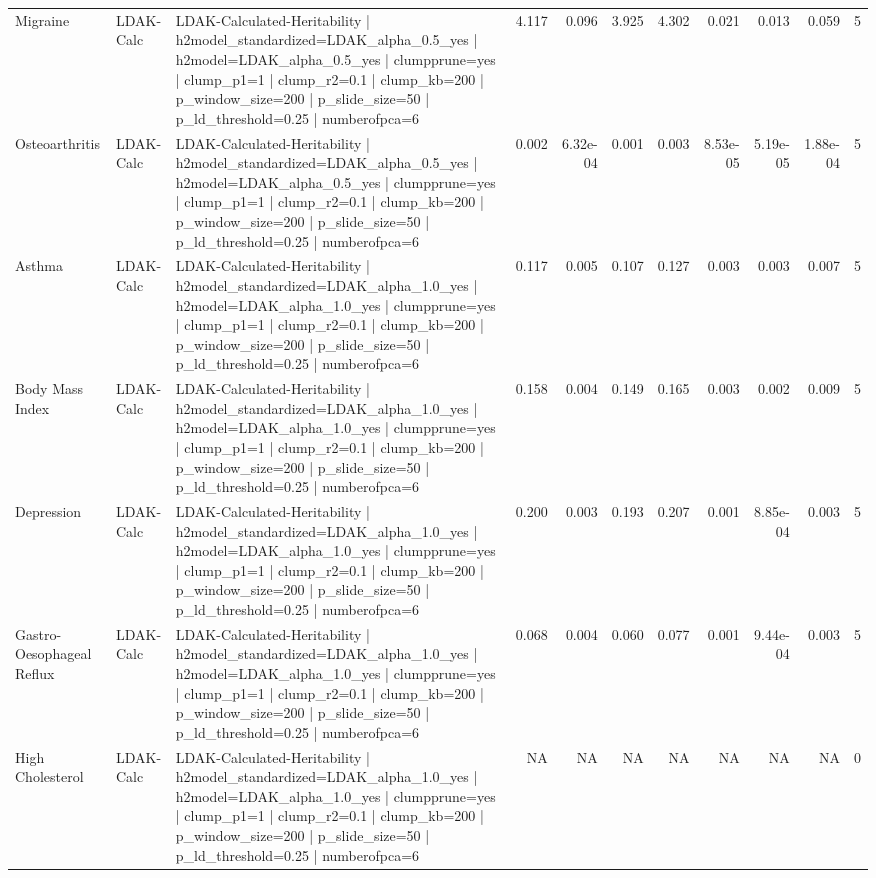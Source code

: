 \begin{landscape}
\begin{longtable}{p{2.4cm}p{1.8cm}p{6.0cm}rrrrrrrr}
Migraine & LDAK-Calc & LDAK-Calculated-Heritability | h2model\_standardized=LDAK\_alpha\_0.5\_yes | h2model=LDAK\_alpha\_0.5\_yes | clumpprune=yes | clump\_p1=1 | clump\_r2=0.1 | clump\_kb=200 | p\_window\_size=200 | p\_slide\_size=50 | p\_ld\_threshold=0.25 | numberofpca=6 & 4.117 & 0.096 & 3.925 & 4.302 & 0.021 & 0.013 & 0.059 & 5 \\
Osteoarthritis & LDAK-Calc & LDAK-Calculated-Heritability | h2model\_standardized=LDAK\_alpha\_0.5\_yes | h2model=LDAK\_alpha\_0.5\_yes | clumpprune=yes | clump\_p1=1 | clump\_r2=0.1 | clump\_kb=200 | p\_window\_size=200 | p\_slide\_size=50 | p\_ld\_threshold=0.25 | numberofpca=6 & 0.002 & 6.32e-04 & 0.001 & 0.003 & 8.53e-05 & 5.19e-05 & 1.88e-04 & 5 \\
Asthma & LDAK-Calc & LDAK-Calculated-Heritability | h2model\_standardized=LDAK\_alpha\_1.0\_yes | h2model=LDAK\_alpha\_1.0\_yes | clumpprune=yes | clump\_p1=1 | clump\_r2=0.1 | clump\_kb=200 | p\_window\_size=200 | p\_slide\_size=50 | p\_ld\_threshold=0.25 | numberofpca=6 & 0.117 & 0.005 & 0.107 & 0.127 & 0.003 & 0.003 & 0.007 & 5 \\
Body Mass Index & LDAK-Calc & LDAK-Calculated-Heritability | h2model\_standardized=LDAK\_alpha\_1.0\_yes | h2model=LDAK\_alpha\_1.0\_yes | clumpprune=yes | clump\_p1=1 | clump\_r2=0.1 | clump\_kb=200 | p\_window\_size=200 | p\_slide\_size=50 | p\_ld\_threshold=0.25 | numberofpca=6 & 0.158 & 0.004 & 0.149 & 0.165 & 0.003 & 0.002 & 0.009 & 5 \\
Depression & LDAK-Calc & LDAK-Calculated-Heritability | h2model\_standardized=LDAK\_alpha\_1.0\_yes | h2model=LDAK\_alpha\_1.0\_yes | clumpprune=yes | clump\_p1=1 | clump\_r2=0.1 | clump\_kb=200 | p\_window\_size=200 | p\_slide\_size=50 | p\_ld\_threshold=0.25 | numberofpca=6 & 0.200 & 0.003 & 0.193 & 0.207 & 0.001 & 8.85e-04 & 0.003 & 5 \\
Gastro-Oesophageal Reflux & LDAK-Calc & LDAK-Calculated-Heritability | h2model\_standardized=LDAK\_alpha\_1.0\_yes | h2model=LDAK\_alpha\_1.0\_yes | clumpprune=yes | clump\_p1=1 | clump\_r2=0.1 | clump\_kb=200 | p\_window\_size=200 | p\_slide\_size=50 | p\_ld\_threshold=0.25 | numberofpca=6 & 0.068 & 0.004 & 0.060 & 0.077 & 0.001 & 9.44e-04 & 0.003 & 5 \\
High Cholesterol & LDAK-Calc & LDAK-Calculated-Heritability | h2model\_standardized=LDAK\_alpha\_1.0\_yes | h2model=LDAK\_alpha\_1.0\_yes | clumpprune=yes | clump\_p1=1 | clump\_r2=0.1 | clump\_kb=200 | p\_window\_size=200 | p\_slide\_size=50 | p\_ld\_threshold=0.25 | numberofpca=6 & NA & NA & NA & NA & NA & NA & NA & 0 \\

\end{longtable}
\end{landscape}
